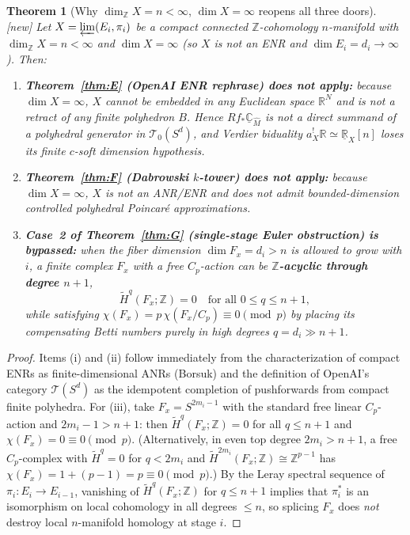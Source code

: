 \documentclass[11pt]{article}
\newtheorem{theorem}{Theorem}[section]
\theoremstyle{definition}
\newcommand{\status}[1]{\textit{\textcolor{black!70}{[#1]}}}
\begin{document}
\begin{theorem}[Why $\dim_{\mathbb{Z}}X=n<\infty$, $\dim X=\infty$ reopens all three doors]
\label{thm:dranishnikov-escape}
\status{new}
Let $X=\varprojlim(E_i,\pi_i)$ be a compact connected $\mathbb{Z}$-cohomology
$n$-manifold with $\dim_{\mathbb{Z}}X=n<\infty$ and $\dim X=\infty$ (so $X$ is
not an ENR and $\dim E_i = d_i \to \infty$).  Then:
\begin{enumerate}[label=(\roman*)]
\item \textbf{Theorem~\ref{thm:E} (OpenAI ENR rephrase) does not apply:}
because $\dim X=\infty$, $X$ cannot be embedded in any Euclidean space
$\mathbb{R}^N$ and is not a retract of any finite polyhedron $B$.  Hence
$Rf_*\underline{\mathbb{C}}_{\widehat{M}}$ is not a direct summand of a
polyhedral generator in $\mathcal{T}_0(S^d)$, and Verdier biduality
$a_X^!\mathbb{R}\simeq\underline{\mathbb{R}}_X[n]$ loses its finite $c$-soft
dimension hypothesis.
\item \textbf{Theorem~\ref{thm:F} (Dabrowski $k$-tower) does not apply:}
because $\dim X=\infty$, $X$ is not an ANR/ENR and does not admit
bounded-dimension controlled polyhedral Poincar\'e approximations.
\item \textbf{Case~2 of Theorem~\ref{thm:G} (single-stage Euler obstruction) is
bypassed:} when the fiber dimension $\dim F_x = d_i > n$ is allowed to grow
with $i$, a finite complex $F_x$ with a free $C_p$-action can be
\textbf{$\mathbb{Z}$-acyclic through degree $n+1$},
\[
\tilde{H}^q(F_x;\mathbb{Z}) = 0 \quad \text{for all } 0\le q\le n+1,
\]
while satisfying $\chi(F_x)=p\,\chi(F_x/C_p)\equiv 0\pmod{p}$ by placing its
compensating Betti numbers purely in high degrees $q = d_i \gg n+1$.
\end{enumerate}
\end{theorem}

\begin{proof}
Items (i) and (ii) follow immediately from the characterization of compact ENRs
as finite-dimensional ANRs (Borsuk) and the definition of OpenAI's category
$\mathcal{T}(S^d)$ as the idempotent completion of pushforwards from compact
finite polyhedra.  For (iii), take $F_x=S^{2m_i-1}$ with the standard free linear
$C_p$-action and $2m_i-1 > n+1$: then $\tilde{H}^q(F_x;\mathbb{Z})=0$ for all
$q\le n+1$ and $\chi(F_x)=0\equiv 0\pmod{p}$.  (Alternatively, in even top
degree $2m_i>n+1$, a free $C_p$-complex with $\tilde{H}^q=0$ for $q<2m_i$ and
$\tilde{H}^{2m_i}(F_x;\mathbb{Z})\cong\mathbb{Z}^{p-1}$ has
$\chi(F_x)=1+(p-1)=p\equiv 0\pmod{p}$.)  By the Leray spectral sequence of
$\pi_i:E_i\to E_{i-1}$, vanishing of $\tilde{H}^q(F_x;\mathbb{Z})$ for
$q\le n+1$ implies that $\pi_i^*$ is an isomorphism on local cohomology in all
degrees $\le n$, so splicing $F_x$ does \emph{not} destroy local
$n$-manifold homology at stage $i$.
\end{proof}
\end{document}
